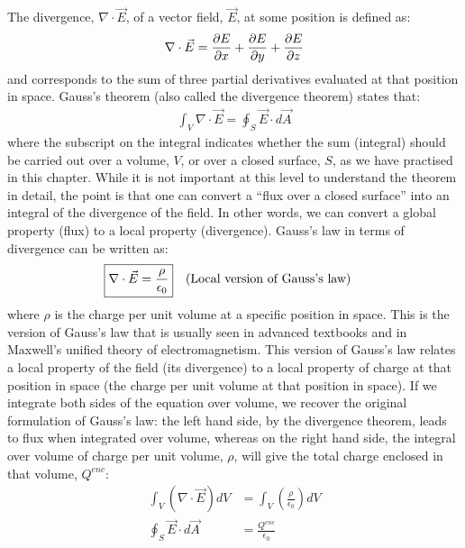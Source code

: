 The divergence, $\nabla \cdot \vec E$, of a vector field, $\vec E$, at some position is defined as:
\begin{align*}
\nabla \cdot \vec E=\frac{\partial E}{\partial x}+\frac{\partial E}{\partial y}+\frac{\partial E}{\partial z}
\end{align*}
and corresponds to the sum of three partial derivatives evaluated at that position in space. Gauss's theorem (also called the divergence theorem) states that:
\begin{align*}
\int_V \nabla \cdot \vec E = \oint_S \vec E \cdot d\vec A
\end{align*}
where the subscript on the integral indicates whether the sum (integral) should be carried out over a volume, $V$, or over a closed surface, $S$, as we have practised in this chapter. While it is not important at this level to understand the theorem in detail, the point is that one can convert a ``flux over a closed surface'' into an integral of the divergence of the field. In other words, we can convert a global property (flux) to a local property (divergence). Gauss's law in terms of divergence can be written as:
\begin{align*}
\Aboxed{\nabla \cdot \vec E &= \frac{\rho}{\epsilon_0}}\quad \text{(Local version of Gauss's law)}
\end{align*}
where $\rho$ is the charge per unit volume at a specific position in space. This is the version of Gauss's law that is usually seen in advanced textbooks and in Maxwell's unified theory of electromagnetism. This version of Gauss's law relates a local property of the field (its divergence) to a local property of charge at that position in space (the charge per unit volume at that position in space). If we integrate both sides of the equation over volume, we recover the original formulation of Gauss's law: the left hand side, by the divergence theorem, leads to flux when integrated over volume, whereas on the right hand side, the integral over volume of charge per unit volume, $\rho$, will give the total charge enclosed in that volume, $Q^{enc}$:
\begin{align*}
\int_V  \left(\nabla \cdot \vec E \right)dV&= \int_V \left(\frac{\rho}{\epsilon_0}\right) dV\\
\oint_S \vec E \cdot d\vec A &=\frac{Q^{enc}}{\epsilon_0}
\end{align*}

\newpage
